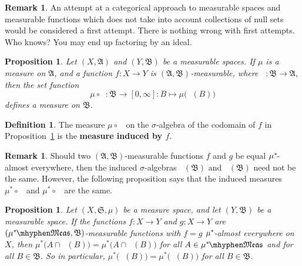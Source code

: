 \documentclass[
twoside=true,
paper=letter,
fontsize=9pt,
pagesize=auto,
leqno,
openany,
headsepline,
overfullrule,
]{scrbook}
\theoremstyle{plain}
\theoremstyle{plain}
\newtheorem{prop}[thm]{Proposition}
\theoremstyle{definition}
\newtheorem{defn}[thm]{Definition}
\newtheorem{rmk}[thm]{Remark}
\theoremstyle{bfnoteitalic}
\theoremstyle{bfnoteroman}
\newcommand{\sigalg}[1]{\mathfrak{#1}}
\newcommand{\textsigma}{\hbox{\large{$\sigma$}}\kern-1pt}
\newcommand{\preimage}[1]{\mathop{#1^{\leftarrow}}}
\newcommand{\meets}{\cap}
\newcommand{\semiring}{\sigalg{S}}
\newcommand{\sigmaalgebra}{\sigalg{A}}
\newcommand{\sigmaalgebraii}{\sigalg{B}}
\newcommand{\measurable}[1]{{#1}\mhyphen\mathfrak{Meas}}
\newcommand{\kernast}{\ast\kern-1pt}
\newcommand{\function}{f}
\newcommand{\measurespace}{X}
\newcommand{\measurespaceii}{Y}
\newcommand{\measure}{\mu}
\begin{document}
\begin{rmk}
An attempt at a categorical approach to measurable spaces and measurable functions which does not take into account collections of null sets would be considered a first attempt.  There is nothing wrong with first attempts. Who knows? You may end up factoring by an ideal.
\end{rmk}





\begin{prop}\label{function_induces_measure}
Let $(\measurespace,\sigmaalgebra)$  and  $(\measurespaceii, \sigmaalgebraii)$ be a measurable spaces.  
If $\measure$ is a measure on $\sigmaalgebra$, and a function $f:\measurespace\to\measurespaceii$ is 
$(\sigmaalgebra, \sigmaalgebraii)$\hyp{}measurable, where $\preimage{f}:\sigmaalgebraii\to\sigmaalgebra$,
then the set function
\[
\measure\circ\preimage{f} 
: \sigmaalgebraii\to [0,\infty] 
: B\mapsto \measure\bigl(\preimage{f}(B)\bigr)
\]
defines a measure on $\sigmaalgebraii$.
\end{prop}


\begin{defn}\label{induced_measure}
The measure $\measure\circ\preimage{\function}$ on the \textsigma-algebra of the codomain of $\function$ in Proposition~\ref{function_induces_measure} is the \textbf{measure induced by $\function$}.
\end{defn}



\begin{rmk} 
Should two $(\sigmaalgebra, \sigmaalgebraii)$\hyp{}measurable functions $f$ and $g$ be equal $\measure^\kernast$-almost everywhere, then the induced \textsigma-algebras $\preimage{f}(\sigmaalgebraii)$ and $\preimage{g}(\sigmaalgebraii)$  need not be the same. However, the following proposition says that the induced measures 
$\measure^*\circ \preimage{f}$ and $\measure^*\circ\preimage{g}$ are the same. 
\end{rmk}


\begin{prop}\label{class_induces_measure}
Let $(\measurespace,\semiring,\measure)$ be a measure space, and let $(\measurespaceii, \sigmaalgebraii)$ be a measurable space.  If  the functions 
$f:\measurespace\to\measurespaceii$ 
and
$g:\measurespace\to\measurespaceii$ 
are $(\measurable{\measure^\kernast}, \sigmaalgebraii)$\hyp{}measurable functions with 
$f = g$ $\measure^\kernast$-almost everywhere on $\measurespace$, then 
$\measure^*\bigl(A\meets \preimage{f}(B)\bigr) 
= 
\measure^*\bigl(A\meets \preimage{g}(B)\bigr)$ for all
$A\in \measurable{\measure^\kernast}$ and for all $B\in\sigmaalgebraii$.
So in particular,
$\measure^*\bigl(\preimage{f}(B)\bigr) 
= 
\measure^*\bigl(\preimage{g}(B)\bigr)$ for all
$B\in\sigmaalgebraii$.
\end{prop}
\end{document}
